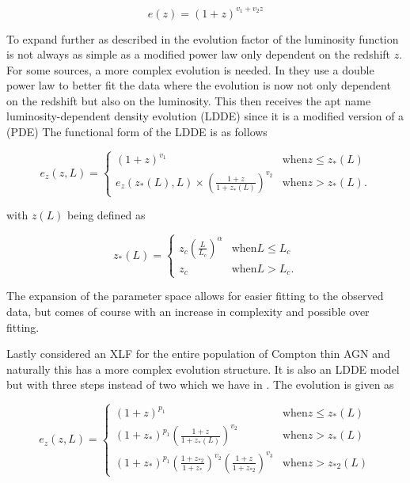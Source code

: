 $$
e(z) = (1 + z)^{v_1 +v_2 z }
$$



 To expand further as described in \cite{Silverman_2008} the evolution factor of the luminosity function is not always as simple as a modified power law only dependent on the redshift $z$.
For some sources, a more complex evolution is needed. In \cite{Silverman_2008} they use a double power law to better fit the data where 
 the evolution is now not only dependent on the redshift but also on the luminosity. This then receives the apt name luminosity-dependent density evolution (LDDE) since it is a modified version of a (PDE)
 The functional form of the LDDE is as follows


 \begin{equation}
    e_z(z, L) = 
    \begin{cases} 
        (1 + z)^{v_1} & \text{when} z \leq z_*(L) \\
        e_z(z_*(L), L) \times \left( \frac{1 + z}{1 + z_*(L)} \right)^{v_2} & \text{when} z >  z_*(L).
    \end{cases}
 \end{equation}

 with $z(L)$ being defined as

 \begin{equation}
    z_*(L) = 
    \begin{cases} 
        z_c \left( \frac{L}{L_c} \right)^\alpha & \text{when} L \leq L_c \\
        z_c & \text{when} L > L_c .
    \end{cases}
 \end{equation}


 The expansion of the parameter space allows for easier fitting to the observed data, but comes of course with an increase in complexity and possible over fitting. 

Lastly \cite{Ueda_2014} considered an XLF for the entire population of Compton thin AGN and naturally this has a more complex evolution structure. It is also an LDDE model but with three steps instead of two which we have in \cite{Silverman_2008}.
The evolution is given as

 
\begin{equation}
    e_z(z, L) = 
    \begin{cases} 
        (1 + z)^{p_1} & \text{when} z \leq z_*(L) \\
        (1 + z_{*})^{p_1} \left( \frac{1 + z}{1 + z_*(L)} \right)^{v_2} & \text{when} z >  z_*(L)\\
        (1 + z_{*})^{p_1} (\frac{1 + z_{*2}}{1+ z_{*}})^{v_2} (\frac{1+z}{1+z_{*2}})^{v_3} & \text{when} z >  z_{*2}(L)

    \end{cases}
\end{equation}

